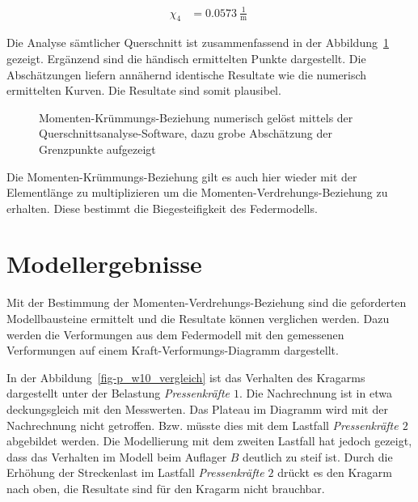 \documentclass[
  11pt,
  letterpaper,
]{scrreprt}
\begin{document}
$$
\begin{aligned}
\chi_{4} &= 0.0573\ \frac{1}{\mathrm{m}} \;
\end{aligned}
$$

Die Analyse sämtlicher Querschnitt ist zusammenfassend in der
Abbildung~\ref{fig-m_chi_schaetzung} gezeigt. Ergänzend sind die
händisch ermittelten Punkte dargestellt. Die Abschätzungen liefern
annähernd identische Resultate wie die numerisch ermittelten Kurven. Die
Resultate sind somit plausibel.

\begin{figure}[H]


\caption{\label{fig-m_chi_schaetzung}Momenten-Krümmungs-Beziehung
numerisch gelöst mittels der Querschnittsanalyse-Software, dazu grobe
Abschätzung der Grenzpunkte aufgezeigt}

\end{figure}%

Die Momenten-Krümmungs-Beziehung gilt es auch hier wieder mit der
Elementlänge zu multiplizieren um die Momenten-Verdrehungs-Beziehung zu
erhalten. Diese bestimmt die Biegesteifigkeit des Federmodells.

\section{Modellergebnisse}\label{modellergebnisse-2}

Mit der Bestimmung der Momenten-Verdrehungs-Beziehung sind die
geforderten Modellbausteine ermittelt und die Resultate können
verglichen werden. Dazu werden die Verformungen aus dem Federmodell mit
den gemessenen Verformungen auf einem Kraft-Verformungs-Diagramm
dargestellt.

In der Abbildung~\ref{fig-p_w10_vergleich} ist das Verhalten des
Kragarms dargestellt unter der Belastung \emph{Pressenkräfte \(1\)}. Die
Nachrechnung ist in etwa deckungsgleich mit den Messwerten. Das Plateau
im Diagramm wird mit der Nachrechnung nicht getroffen. Bzw. müsste dies
mit dem Lastfall \emph{Pressenkräfte \(2\)} abgebildet werden. Die
Modellierung mit dem zweiten Lastfall hat jedoch gezeigt, dass das
Verhalten im Modell beim Auflager \(B\) deutlich zu steif ist. Durch die
Erhöhung der Streckenlast im Lastfall \emph{Pressenkräfte \(2\)} drückt
es den Kragarm nach oben, die Resultate sind für den Kragarm nicht
brauchbar.
\end{document}
